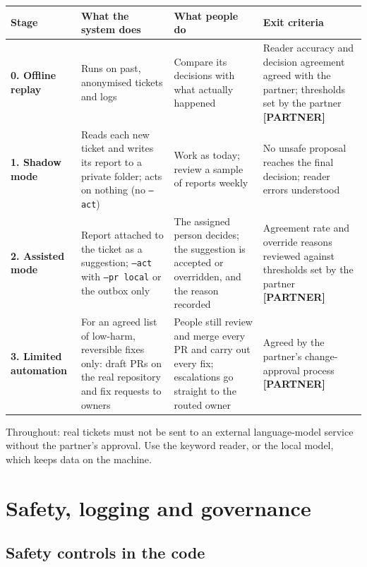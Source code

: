 \documentclass[11pt,a4paper]{article}
\newcommand{\partner}{\textbf{[PARTNER]}}
\begin{document}
{\small
\begin{longtable}{>{\raggedright\arraybackslash}p{2.3cm}>{\raggedright\arraybackslash}p{4.4cm}>{\raggedright\arraybackslash}p{4.2cm}>{\raggedright\arraybackslash}p{4.0cm}}
\toprule
\textbf{Stage} & \textbf{What the system does} & \textbf{What people do} & \textbf{Exit criteria} \\
\midrule\endhead
\textbf{0. Offline replay} & Runs on past, anonymised tickets and logs & Compare its decisions with what actually happened & Reader accuracy and decision agreement agreed with the partner; thresholds set by the partner \partner \\
\textbf{1. Shadow mode} & Reads each new ticket and writes its report to a private folder; acts on nothing (no \texttt{--act}) & Work as today; review a sample of reports weekly & No unsafe proposal reaches the final decision; reader errors understood \\
\textbf{2. Assisted mode} & Report attached to the ticket as a suggestion; \texttt{--act} with \texttt{--pr local} or the outbox only & The assigned person decides; the suggestion is accepted or overridden, and the reason recorded & Agreement rate and override reasons reviewed against thresholds set by the partner \partner \\
\textbf{3. Limited automation} & For an agreed list of low-harm, reversible fixes only: draft PRs on the real repository and fix requests to owners & People still review and merge every PR and carry out every fix; escalations go straight to the routed owner & Agreed by the partner's change-approval process \partner \\
\bottomrule
\end{longtable}}

Throughout: real tickets must not be sent to an external language-model service without the
partner's approval. Use the keyword reader, or the local model, which keeps data on the machine.

\section{Safety, logging and governance}

\subsection*{Safety controls in the code}
\end{document}
